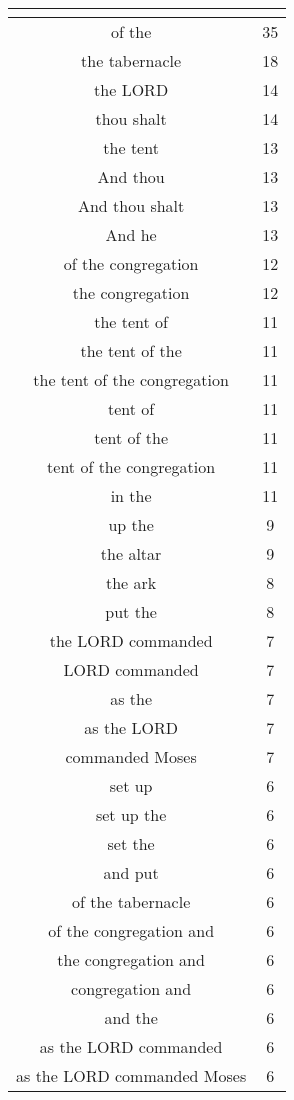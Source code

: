 \begin{center}
\begin{longtable}{|c|c|}
\hline \multicolumn{2}{c}{{ }} \\ \hline
\endfoot 
of the & 35\\ \hline 
the tabernacle & 18\\ \hline 
the LORD & 14\\ \hline 
thou shalt & 14\\ \hline 
the tent & 13\\ \hline 
And thou & 13\\ \hline 
And thou shalt & 13\\ \hline 
And he & 13\\ \hline 
of the congregation & 12\\ \hline 
the congregation & 12\\ \hline 
the tent of & 11\\ \hline 
the tent of the & 11\\ \hline 
the tent of the congregation & 11\\ \hline 
tent of & 11\\ \hline 
tent of the & 11\\ \hline 
tent of the congregation & 11\\ \hline 
in the & 11\\ \hline 
up the & 9\\ \hline 
the altar & 9\\ \hline 
the ark & 8\\ \hline 
put the & 8\\ \hline 
the LORD commanded & 7\\ \hline 
LORD commanded & 7\\ \hline 
as the & 7\\ \hline 
as the LORD & 7\\ \hline 
commanded Moses & 7\\ \hline 
set up & 6\\ \hline 
set up the & 6\\ \hline 
set the & 6\\ \hline 
and put & 6\\ \hline 
of the tabernacle & 6\\ \hline 
of the congregation and & 6\\ \hline 
the congregation and & 6\\ \hline 
congregation and & 6\\ \hline 
and the & 6\\ \hline 
as the LORD commanded & 6\\ \hline 
as the LORD commanded Moses & 6\\ \hline 

\end{longtable}
\end{center}
